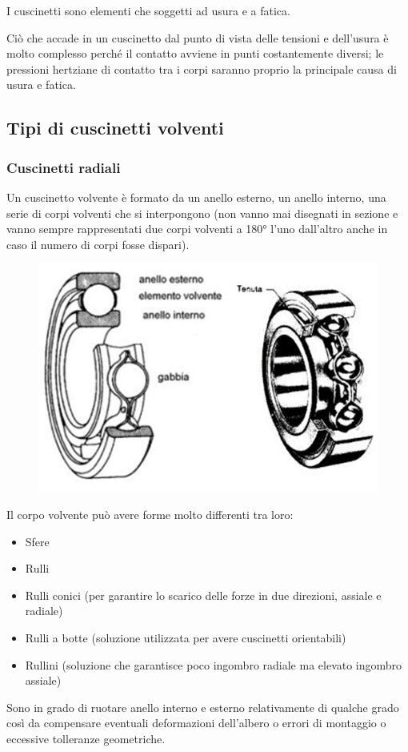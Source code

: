 \documentclass[a4paper, 15pt]{article}
\begin{document}
			I cuscinetti sono elementi che soggetti ad usura e a fatica. 
			
			Ciò che accade in un cuscinetto dal punto di vista delle tensioni e dell’usura è molto complesso perché il contatto avviene in punti costantemente diversi; le pressioni hertziane di contatto tra i corpi saranno proprio la principale causa di usura e fatica. 
\newpage			
			\subsection{Tipi di cuscinetti volventi}
			\subsubsection{Cuscinetti radiali}
			Un cuscinetto volvente è formato da un anello esterno, un anello interno, una serie di corpi volventi che si interpongono (non vanno mai disegnati in sezione e vanno sempre rappresentati due corpi volventi a 180° l’uno dall’altro anche in caso il numero di corpi fosse dispari).
			\begin{figure}[H]
				\centering
				\includegraphics[width=0.5\linewidth]{immagini/screenshot001}
				\label{fig:screenshot001}
			\end{figure}
			Il corpo volvente può avere forme molto differenti tra loro:
			\begin{itemize}
			\item	Sfere
			\item	Rulli
			\item	Rulli conici (per garantire lo scarico delle forze in due direzioni, assiale e radiale)
			\item	Rulli a botte (soluzione utilizzata per avere cuscinetti orientabili)
			\item	Rullini (soluzione che garantisce poco ingombro radiale ma elevato ingombro assiale)
			\end{itemize}
			Sono in grado di ruotare anello interno e esterno relativamente di qualche grado così da compensare eventuali deformazioni dell’albero o errori di montaggio o eccessive tolleranze geometriche. \newline 
			
\end{document}
